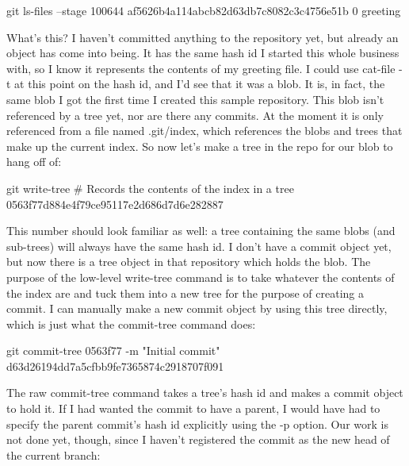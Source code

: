 \documentclass{report}
\begin{document}
\begin{itemize}
\begin{bashcode}
                git ls-files --stage 
                100644 af5626b4a114abcb82d63db7c8082c3c4756e51b 0 greeting
            \end{bashcode}
            \bigbreak \noindent 
            What’s this? I haven’t committed anything to the repository yet, but already an object has come into being. It has the same hash id I started this whole business with, so I know it represents the contents of my greeting file. I could use cat-file -t at this point on the hash id, and I’d see that it was a blob. It is, in fact, the same blob I got the first time I created this sample repository.
            \bigbreak \noindent 
            This blob isn’t referenced by a tree yet, nor are there any commits. At the moment it is only referenced from a file named .git/index, which references the blobs and trees that make up the current index. So now let’s make a tree in the repo for our blob to hang off of:
            \bigbreak \noindent 
            \begin{bashcode}
                git write-tree # Records the contents of the index in a tree
                0563f77d884e4f79ce95117e2d686d7d6e282887
            \end{bashcode}
            \bigbreak \noindent 
            This number should look familiar as well: a tree containing the same blobs (and sub-trees) will always have the same hash id. I don’t have a commit object yet, but now there is a tree object in that repository which holds the blob. The purpose of the low-level write-tree command is to take whatever the contents of the index are and tuck them into a new tree for the purpose of creating a commit.
            \bigbreak \noindent 
            I can manually make a new commit object by using this tree directly, which is just what the commit-tree command does:
            \bigbreak \noindent 
            \begin{bashcode}
                git commit-tree 0563f77 -m "Initial commit"
                d63d26194dd7a5cfbb9fe7365874c2918707f091
            \end{bashcode}
            \bigbreak \noindent 
            The raw commit-tree command takes a tree’s hash id and makes a commit object to hold it. If I had wanted the commit to have a parent, I would have had to specify the parent commit’s hash id explicitly using the -p option.
            \bigbreak \noindent 
            Our work is not done yet, though, since I haven’t registered the commit as the new head of the current branch:
            \bigbreak \noindent 
            \begin{bashcode}

\end{bashcode}
\end{itemize}
\end{document}
